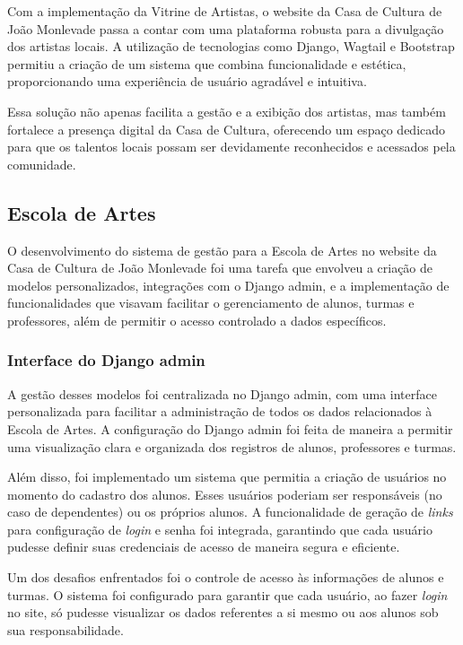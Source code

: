 Com a implementação da Vitrine de Artistas, o website da Casa de Cultura de João Monlevade passa a contar com uma plataforma robusta para a divulgação dos artistas locais. A utilização de tecnologias como Django, Wagtail e Bootstrap permitiu a criação de um sistema que combina funcionalidade e estética, proporcionando uma experiência de usuário agradável e intuitiva.

Essa solução não apenas facilita a gestão e a exibição dos artistas, mas também fortalece a presença digital da Casa de Cultura, oferecendo um espaço dedicado para que os talentos locais possam ser devidamente reconhecidos e acessados pela comunidade.

\subsection{Escola de Artes}

O desenvolvimento do sistema de gestão para a Escola de Artes no website da Casa de Cultura de João Monlevade foi uma tarefa que envolveu a criação de modelos personalizados, integrações com o Django admin, e a implementação de funcionalidades que visavam facilitar o gerenciamento de alunos, turmas e professores, além de permitir o acesso controlado a dados específicos.

\subsubsection{Interface do Django admin}

A gestão desses modelos foi centralizada no Django admin, com uma interface personalizada para facilitar a administração de todos os dados relacionados à Escola de Artes. A configuração do Django admin foi feita de maneira a permitir uma visualização clara e organizada dos registros de alunos, professores e turmas.

Além disso, foi implementado um sistema que permitia a criação de usuários no momento do cadastro dos alunos. Esses usuários poderiam ser responsáveis (no caso de dependentes) ou os próprios alunos. A funcionalidade de geração de \textit{links} para configuração de \textit{login} e senha foi integrada, garantindo que cada usuário pudesse definir suas credenciais de acesso de maneira segura e eficiente.

Um dos desafios enfrentados foi o controle de acesso às informações de alunos e turmas. O sistema foi configurado para garantir que cada usuário, ao fazer \textit{login} no site, só pudesse visualizar os dados referentes a si mesmo ou aos alunos sob sua responsabilidade.

